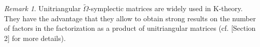 \documentclass[10pt]{amsart}
\theoremstyle{remark}
\newtheorem{rema}[theo]{Remark}
\begin{document}
\begin{rema}
Unitriangular $\tilde{\Omega}$-symplectic matrices are widely used in K-theory. They have the advantage that they allow to obtain strong results on the number of factors in the factorization as a product of unitriangular matrices (cf. \cite{HKS}[Section 2] for more details). 
\end{rema}
\end{document}
